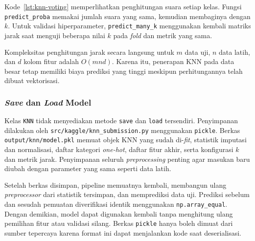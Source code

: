 
Kode~\ref{lst:knn-voting} memperlihatkan penghitungan suara setiap kelas. Fungsi \texttt{predict\_proba} memakai jumlah suara yang sama, kemudian membaginya dengan $k$. Untuk validasi hiperparameter, \texttt{predict\_many\_k} menggunakan kembali matriks jarak saat menguji beberapa nilai $k$ pada \textit{fold} dan metrik yang sama.


Kompleksitas penghitungan jarak secara langsung untuk $m$ data uji, $n$ data latih, dan $d$ kolom fitur adalah $O(mnd)$. Karena itu, penerapan KNN pada data besar tetap memiliki biaya prediksi yang tinggi meskipun perhitungannya telah dibuat vektorisasi.

\subsubsection{\textit{Save} dan \textit{Load} Model}
Kelas \texttt{KNN} tidak menyediakan metode \texttt{save} dan \texttt{load} tersendiri. Penyimpanan dilakukan oleh \nolinkurl{src/kaggle/knn_submission.py} menggunakan \texttt{pickle}. Berkas \nolinkurl{output/knn/model.pkl} memuat objek KNN yang sudah di-\textit{fit}, statistik imputasi dan normalisasi, daftar kategori \textit{one-hot}, daftar fitur akhir, serta konfigurasi $k$ dan metrik jarak. Penyimpanan seluruh \textit{preprocessing} penting agar masukan baru diubah dengan parameter yang sama seperti data latih.

Setelah berkas disimpan, pipeline memuatnya kembali, membangun ulang \textit{preprocessor} dari statistik tersimpan, dan memprediksi data uji. Prediksi sebelum dan sesudah pemuatan diverifikasi identik menggunakan \texttt{np.array\_equal}. Dengan demikian, model dapat digunakan kembali tanpa menghitung ulang pemilihan fitur atau validasi silang. Berkas \texttt{pickle} hanya boleh dimuat dari sumber tepercaya karena format ini dapat menjalankan kode saat deserialisasi.